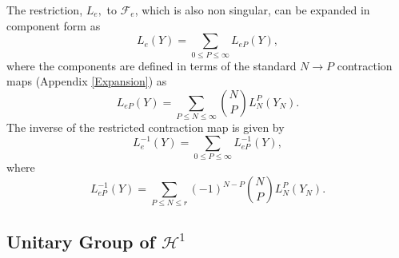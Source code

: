 \documentclass[aps,preprint]{revtex4}%
\begin{document}
The restriction, $L_{e},$ to $\mathcal{F}_{e}$, which is also non singular,
can be expanded in component form as
\begin{equation}
L_{e}\left(  Y\right)  =\sum_{0\leq P\leq\infty}L_{eP}\left(  Y\right)  ,
\end{equation}
where the components are defined in terms of the standard $N\rightarrow P$
contraction maps \cite{Kummar} (Appendix \ref{Expansion}) as
\begin{equation}
L_{eP}\left(  Y\right)  =\sum_{P\leq N\leq\infty}\binom{N}{P}L_{N}^{P}\left(
Y_{N}\right)  .
\end{equation}
The inverse of the restricted contraction map is given by \cite{Kummar70}
\begin{equation}
L_{e}^{-1}\left(  Y\right)  =\sum_{0\leq P\leq\infty}L_{eP}^{-1}\left(
Y\right)  ,
\end{equation}
where%
\begin{equation}
L_{eP}^{-1}\left(  Y\right)  =\sum_{P\leq N\leq r}\left(  -1\right)
^{N-P}\binom{N}{P}L_{N}^{P}\left(  Y_{N}\right)  .
\end{equation}


\subsection{Unitary Group of $\mathcal{H}^{1}$}
\end{document}
